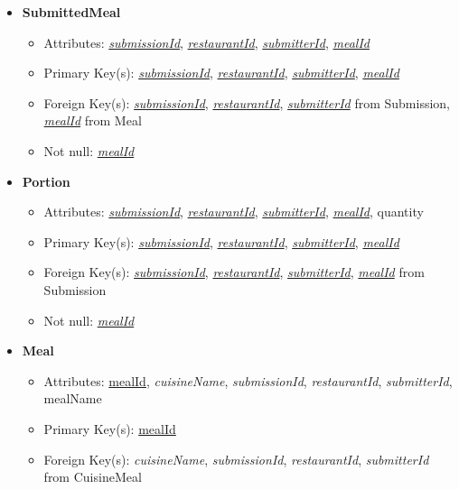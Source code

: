 \documentclass{article}
\begin{document}
\begin{itemize}
        \item \textbf{SubmittedMeal}
        \begin{itemize}
            \item Attributes: \underline{\textit{submissionId}}, \underline{\textit{restaurantId}}, \underline{\textit{submitterId}}, \underline{\textit{mealId}}
            \item Primary Key(s): \underline{\textit{submissionId}}, \underline{\textit{restaurantId}}, \underline{\textit{submitterId}}, \underline{\textit{mealId}}
            \item Foreign Key(s): \underline{\textit{submissionId}}, \underline{\textit{restaurantId}}, \underline{\textit{submitterId}} from Submission, \underline{\textit{mealId}} from Meal
            \item Not null: \underline{\textit{mealId}}
        \end{itemize}

        \item \textbf{Portion}
        \begin{itemize}
            \item Attributes: \underline{\textit{submissionId}}, \underline{\textit{restaurantId}}, \underline{\textit{submitterId}}, \underline{\textit{mealId}}, quantity
            \item Primary Key(s): \underline{\textit{submissionId}}, \underline{\textit{restaurantId}}, \underline{\textit{submitterId}}, \underline{\textit{mealId}}
            \item Foreign Key(s): \underline{\textit{submissionId}}, \underline{\textit{restaurantId}}, \underline{\textit{submitterId}}, \underline{\textit{mealId}} from Submission
            \item Not null: \underline{\textit{mealId}}
        \end{itemize}

        \item \textbf{Meal}
        \begin{itemize}
            \item Attributes: \underline{mealId}, \textit{cuisineName}, \textit{submissionId}, \textit{restaurantId}, \textit{submitterId}, mealName
            \item Primary Key(s): \underline{mealId}
            \item Foreign Key(s): \textit{cuisineName}, \textit{submissionId}, \textit{restaurantId}, \textit{submitterId} from CuisineMeal
        \end{itemize}


\end{itemize}
\end{document}
